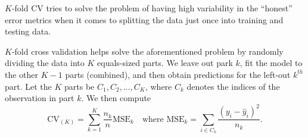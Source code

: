 \documentclass[12pt]{article}
\begin{document}
\begin{enumerate}
\begin{tcolorbox}[colback=white, sharp corners]

$K$-fold CV tries to solve the problem of having high variability in the ``honest'' error metrics when it comes to splitting the data just once into training and testing data.

\end{tcolorbox}



\begin{tcolorbox}[colback=white, sharp corners]
$K$-fold cross validation helps solve the aforementioned problem by randomly dividing the data into $K$ equals-sized parts. We leave out park $k$, fit the model to the other $K-1$ parts (combined), and then obtain predictions for the left-out $k^{th}$ part. Let the $K$ parts be $C_1, C_2, \ldots, C_K$, where $C_k$ denotes the indices of the observation in part $k$. We then compute 
\[
\text{CV}_{(K)} = \sum_{k = 1}^K \dfrac{n_k}{n}\text{MSE}_k \quad \text{where } \text{MSE}_k = \sum_{i\in C_k} \dfrac{(y_i - \hat{y}_i)^2}{n_k}.
\]
\end{tcolorbox}


\end{enumerate}
\end{document}
